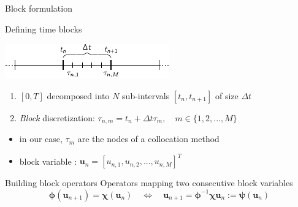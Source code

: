 \documentclass[11pt,aspectratio=43]{beamer}
\newcommand{\vect}[1]{\boldsymbol{#1}}
\newcommand{\uvect}{\vect{u}}
\begin{document}
\begin{frame}{Block formulation}\vskip5pt
    \begin{block}{Defining time blocks}
    	\begin{center}
    		\includegraphics[width=0.6\linewidth]{decompositions.pdf}
    	\end{center}\vskip-10pt
        \begin{enumerate}
            \item $[0,T]$ decomposed into $N$ sub-intervals $[t_n, t_{n+1}]$ of  
            size $\Delta t$
            \item \emph{Block} discretization: $\tau_{n,m} = t_n + \Delta{t}\tau_m,\quad m \in \{1, 2,..., M\}$\\
        \end{enumerate}
    \end{block}
	\begin{itemize}
		\item in our case, $\tau_m$ are the nodes of a collocation method
		\item block variable : $\uvect_n = [u_{n,1}, u_{n,2}, ..., u_{n,M}]^T$
	\end{itemize}\vskip5pt
	\begin{block}{Building block operators}
		Operators mapping two consecutive block variables\vspace{-10pt}
		$$\bm{\phi}(\uvect_{n+1}) = \bm{\chi}(\uvect_{n})
		\quad\Leftrightarrow\quad 
		\uvect_{n+1} = \bm{\phi}^{-1}\bm{\chi}\uvect_{n}
		:= \bm{\psi}(\uvect_{n})$$
	\end{block}	
\end{frame}
\end{document}
